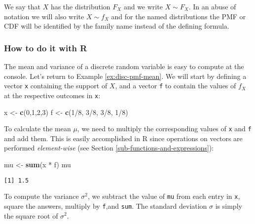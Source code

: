 \documentclass[]{book}
\newenvironment{Shaded}{\begin{snugshade}}{\end{snugshade}}
\newcommand{\KeywordTok}[1]{\textcolor[rgb]{0.13,0.29,0.53}{\textbf{{#1}}}}
\newcommand{\DecValTok}[1]{\textcolor[rgb]{0.00,0.00,0.81}{{#1}}}
\newcommand{\StringTok}[1]{\textcolor[rgb]{0.31,0.60,0.02}{{#1}}}
\newcommand{\NormalTok}[1]{{#1}}
\numberwithin{equation}{chapter}
\numberwithin{figure}{chapter}
\theoremstyle{plain}
\theoremstyle{definition}
\theoremstyle{remark}
\theoremstyle{definition}
\theoremstyle{definition}
\theoremstyle{remark}
\begin{document}
We say that \(X\) has the distribution \(F_{X}\) and we write
\(X\sim F_{X}\). In an abuse of notation we will also write
\(X\sim f_{X}\) and for the named distributions the PMF or CDF will be
identified by the family name instead of the defining formula.

\subsubsection{How to do it with R}\label{sub-disc-rv-how-r}

The mean and variance of a discrete random variable is easy to compute
at the console. Let's return to Example \ref{ex:disc-pmf-mean}. We will
start by defining a vector \texttt{x} containing the support of \(X\),
and a vector \texttt{f} to contain the values of \(f_{X}\) at the
respective outcomes in \texttt{x}:

\begin{Shaded}
\begin{Highlighting}[]
\NormalTok{x <-}\StringTok{ }\KeywordTok{c}\NormalTok{(}\DecValTok{0}\NormalTok{,}\DecValTok{1}\NormalTok{,}\DecValTok{2}\NormalTok{,}\DecValTok{3}\NormalTok{)}
\NormalTok{f <-}\StringTok{ }\KeywordTok{c}\NormalTok{(}\DecValTok{1}\NormalTok{/}\DecValTok{8}\NormalTok{, }\DecValTok{3}\NormalTok{/}\DecValTok{8}\NormalTok{, }\DecValTok{3}\NormalTok{/}\DecValTok{8}\NormalTok{, }\DecValTok{1}\NormalTok{/}\DecValTok{8}\NormalTok{)}
\end{Highlighting}
\end{Shaded}

To calculate the mean \(\mu\), we need to multiply the corresponding
values of \texttt{x} and \texttt{f} and add them. This is easily
accomplished in R since operations on vectors are performed
\emph{element-wise} (see Section \ref{sub-functions-and-expressions}):

\begin{Shaded}
\begin{Highlighting}[]
\NormalTok{mu <-}\StringTok{ }\KeywordTok{sum}\NormalTok{(x *}\StringTok{ }\NormalTok{f)}
\NormalTok{mu}
\end{Highlighting}
\end{Shaded}

\begin{verbatim}
[1] 1.5
\end{verbatim}

To compute the variance \(\sigma^{2}\), we subtract the value of
\texttt{mu} from each entry in \texttt{x}, square the answers, multiply
by \texttt{f},and \texttt{sum}. The standard deviation \(\sigma\) is
simply the square root of \(\sigma^{2}\).
\end{document}
